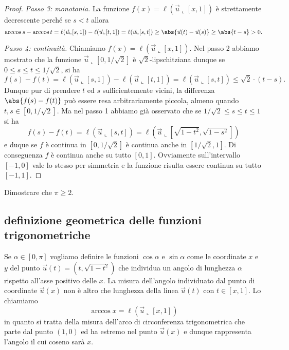 \begin{proof}
    \emph{Passo 3: monotonia.}
      La funzione $f(x)=\ell(\vec u\llcorner[x,1])$ 
      è strettamente decrescente perché se $s<t$ allora 
      \[
       \arccos s - \arccos t 
       = \ell(\vec u\llcorner [s,1]) - \ell(\vec u\llcorner [t,1])  
       = \ell(\vec u\llcorner [s,t]) 
       \ge \abs{\vec u(t)-\vec u(s)} 
       \ge \abs{t-s} > 0.
      \]
    
      \emph{Passo 4: continuità.}
      Chiamiamo $f(x)= \ell(\vec u \llcorner[x,1])$.
      Nel passo 2 abbiamo mostrato che la funzione $\vec u \llcorner [0,1/\sqrt 2]$ 
      è $\sqrt 2$-lipschitziana dunque se $0\le s \le t \le 1/\sqrt 2$, si ha 
      \[
      f(s)-f(t) = \ell(\vec u\llcorner [s,1]) - \ell(\vec u\llcorner[t,1])
      = \ell(\vec u \llcorner[s,t]) 
      \le \sqrt 2\cdot (t-s).
      \]
      Dunque pur di prendere $t$ ed $s$ sufficientemente vicini, 
      la differenza $\abs{f(s)-f(t)}$ può essere resa arbitrariamente piccola,
      almeno quando $t,s \in [0,1/\sqrt 2]$.
      Ma nel passo 1 abbiamo già osservato che se $1/\sqrt 2 \le s \le t \le 1$ 
      si ha 
      \[
      f(s)-f(t) 
      = \ell(\vec u \llcorner [s,t])
      = \ell(\vec u \llcorner [\sqrt{1-t^2},\sqrt{1-s^2}])  
      \]
      e duque se $f$ è continua in $[0,1/\sqrt 2]$ è continua 
      anche in $[1/\sqrt 2, 1]$. 
      Di conseguenza $f$ è continua anche su tutto $[0,1]$.
      Ovviamente sull'intervallo $[-1,0]$ vale lo stesso per simmetria
      e la funzione risulta essere continua su tutto $[-1,1]$.
    \end{proof}
    
    \begin{exercise}
    Dimostrare che $\pi\ge 2$.
    \end{exercise}
    
    \subsection{definizione geometrica delle funzioni trigonometriche}
    Se $\alpha\in [0,\pi]$
    vogliamo definire le funzioni $\cos \alpha$ e $\sin \alpha$ come le coordinate $x$ 
    e $y$ del punto $\vec u(t)=(t,\sqrt{1-t^2})$ che individua un angolo di lunghezza 
    $\alpha$ rispetto all'asse positivo delle $x$.
    La misura dell'angolo individuato dal punto di coordinate $\vec u(x)$ non è altro che
    lunghezza della linea $\vec u(t)$ con $t\in[x,1]$. 
    Lo chiamiamo
    \[
      \arccos x = \ell(\vec u\llcorner [x,1])
    \] 
    in quanto si tratta della misura dell'arco di circonferenza trigonometrica che parte 
    dal punto $(1,0)$ ed ha estremo nel punto $\vec u(x)$ e dunque rappresenta 
    l'angolo il cui coseno sarà $x$.
    
